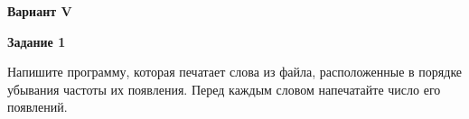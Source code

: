 \begin{center}
    \textbf{Вариант V}
\end{center}

\textbf{Задание 1}

Напишите программу, которая печатает слова из файла, расположенные в порядке убывания частоты их появления. Перед каждым словом напечатайте число его появлений.